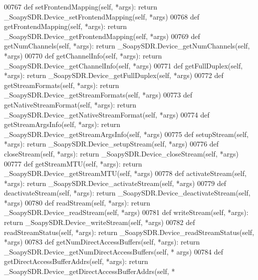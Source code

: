 \begin{DoxyCode}
{{{{{00767     \textcolor{keyword}{def }setFrontendMapping(self, *args): \textcolor{keywordflow}{return} \_SoapySDR.Device\_setFrontendMapping(self, *args)
00768     \textcolor{keyword}{def }getFrontendMapping(self, *args): \textcolor{keywordflow}{return} \_SoapySDR.Device\_getFrontendMapping(self, *args)
00769     \textcolor{keyword}{def }getNumChannels(self, *args): \textcolor{keywordflow}{return} \_SoapySDR.Device\_getNumChannels(self, *args)
00770     \textcolor{keyword}{def }getChannelInfo(self, *args): \textcolor{keywordflow}{return} \_SoapySDR.Device\_getChannelInfo(self, *args)
00771     \textcolor{keyword}{def }getFullDuplex(self, *args): \textcolor{keywordflow}{return} \_SoapySDR.Device\_getFullDuplex(self, *args)
00772     \textcolor{keyword}{def }getStreamFormats(self, *args): \textcolor{keywordflow}{return} \_SoapySDR.Device\_getStreamFormats(self, *args)
00773     \textcolor{keyword}{def }getNativeStreamFormat(self, *args): \textcolor{keywordflow}{return} \_SoapySDR.Device\_getNativeStreamFormat(self, *args)
00774     \textcolor{keyword}{def }getStreamArgsInfo(self, *args): \textcolor{keywordflow}{return} \_SoapySDR.Device\_getStreamArgsInfo(self, *args)
00775     \textcolor{keyword}{def }setupStream(self, *args): \textcolor{keywordflow}{return} \_SoapySDR.Device\_setupStream(self, *args)
00776     \textcolor{keyword}{def }closeStream(self, *args): \textcolor{keywordflow}{return} \_SoapySDR.Device\_closeStream(self, *args)
00777     \textcolor{keyword}{def }getStreamMTU(self, *args): \textcolor{keywordflow}{return} \_SoapySDR.Device\_getStreamMTU(self, *args)
00778     \textcolor{keyword}{def }activateStream(self, *args): \textcolor{keywordflow}{return} \_SoapySDR.Device\_activateStream(self, *args)
00779     \textcolor{keyword}{def }deactivateStream(self, *args): \textcolor{keywordflow}{return} \_SoapySDR.Device\_deactivateStream(self, *args)
00780     \textcolor{keyword}{def }readStream(self, *args): \textcolor{keywordflow}{return} \_SoapySDR.Device\_readStream(self, *args)
00781     \textcolor{keyword}{def }writeStream(self, *args): \textcolor{keywordflow}{return} \_SoapySDR.Device\_writeStream(self, *args)
00782     \textcolor{keyword}{def }readStreamStatus(self, *args): \textcolor{keywordflow}{return} \_SoapySDR.Device\_readStreamStatus(self, *args)
00783     \textcolor{keyword}{def }getNumDirectAccessBuffers(self, *args): \textcolor{keywordflow}{return} \_SoapySDR.Device\_getNumDirectAccessBuffers(self, *
      args)
00784     \textcolor{keyword}{def }getDirectAccessBufferAddrs(self, *args): \textcolor{keywordflow}{return} \_SoapySDR.Device\_getDirectAccessBufferAddrs(self, *
}}}}}
\end{DoxyCode}
